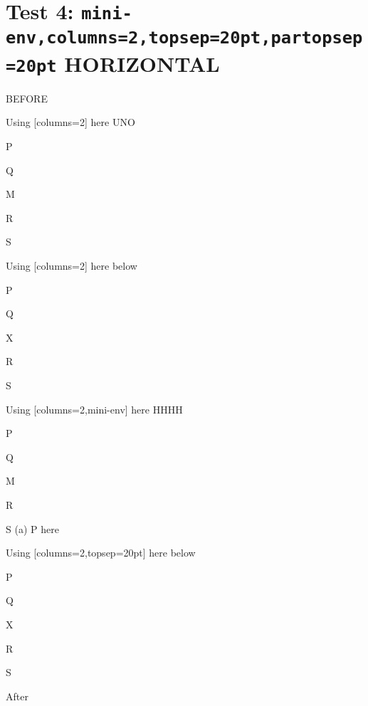 \documentclass[12pt]{article}
\begin{document}
\section{Test 4: \texttt{mini-env,columns=2,topsep=20pt,partopsep=20pt} HORIZONTAL}

BEFORE
\begin{enumext}[columns=2]
\item Using [columns=2] here UNO
  \begin{enumext}[columns=2,topsep=20pt,partopsep=20pt]%
     \item  P \item Q \item M \item R \item S
  \end{enumext}

\item Using [columns=2] here below
\begin{enumext}[columns=2,topsep=20pt]%
     \item  P \item Q \item X  \item R \item S
  \end{enumext}

\columnbreak

\item Using [columns=2,mini-env] here HHHH
  \begin{enumext}[columns=2,mini-env={0.4\linewidth},topsep=20pt,partopsep=20pt]%
    \item  P \item Q \item M \item R \item S
    \miniright
    (a) P here
  \end{enumext}

\item Using [columns=2,topsep=20pt] here below
\begin{enumext}[columns=2,topsep=20pt]%
     \item  P \item Q \item X  \item R \item S
  \end{enumext}

\end{enumext}
After
\end{document}

